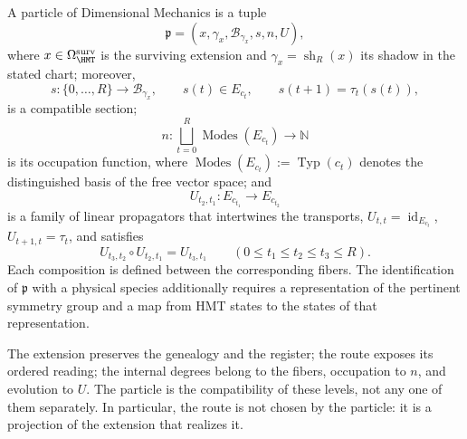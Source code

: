 \begin{definition}
A particle of Dimensional Mechanics is a tuple
\[
 \mathfrak p=(x,\gamma_x,\mathcal B_{\gamma_x},s,n,U),
\]
where \(x\in\Omega_{\HMT}^{\rm surv}\) is the surviving extension and
\(\gamma_x=\operatorname{sh}_R(x)\) its shadow in the stated chart; moreover,
\[
 s:\{0,\ldots,R\}\longrightarrow\mathcal B_{\gamma_x},\qquad
 s(t)\in E_{c_t},\qquad s(t+1)=\tau_t(s(t)),
\]
is a compatible section;
\[
 n:\bigsqcup_{t=0}^{R}\operatorname{Modes}(E_{c_t})
 \longrightarrow\mathbb N
\]
is its occupation function, where
\(\operatorname{Modes}(E_{c_t}):=\operatorname{Typ}(c_t)\) denotes the distinguished
basis of the free vector space; and
\[
 U_{t_2,t_1}:E_{c_{t_1}}\longrightarrow E_{c_{t_2}}
\]
is a family of linear propagators that intertwines the transports,
\(U_{t,t}=\operatorname{id}_{E_{c_t}}\),
\(U_{t+1,t}=\tau_t\), and satisfies
\[
 U_{t_3,t_2}\circ U_{t_2,t_1}=U_{t_3,t_1}
 \qquad(0\leq t_1\leq t_2\leq t_3\leq R).
\]
Each composition is defined between the corresponding fibers.
The identification of \(\mathfrak p\) with a physical
species additionally requires a representation of the pertinent symmetry group
and a map from HMT states to the states of that representation.
\end{definition}

The extension preserves the genealogy and the register; the route exposes its ordered reading; the internal degrees belong to the fibers, occupation to \(n\), and evolution to \(U\). The particle is the compatibility of these levels, not any one of them separately. In particular, the route is not chosen by the particle: it is a projection of the extension that realizes it.

